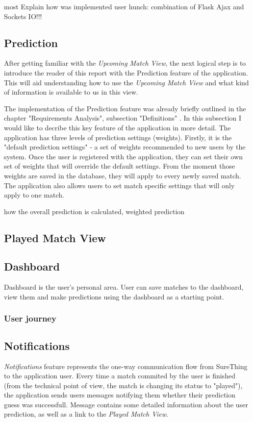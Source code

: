 most Explain how was implemented user hunch: combination of Flask Ajax and Sockets IO!!!
 
\subsection{Prediction}
\label{subsec:predictionimplementation}
After getting familiar with the \emph{Upcoming Match View}, the next logical step is to introduce the reader of this report with the Prediction feature of the application. This will aid understanding how to use the \emph{Upcoming Match View} and what kind of information is available to us in this view.

The implementation of the Prediction feature was already briefly outlined in the chapter "Requirements Analysis", subsection "Definitions" \cite{subsec:definitions}. In this subsection I would like to decribe this key feature of the application in more detail. The application has three levels of prediction settings (weights). Firstly, it is the "default prediction settings" - a set of weights recommended to new users by the system. Once the user is registered with the application, they can set their own set of weights that will override the default settings. From the moment those weights are saved in the database, they will apply to every newly saved match. The application also allows users to set match specific settings that will only apply to one match. 
 


how the overall prediction is calculated, weighted prediction

\subsection{Played Match View}
\label{subsec:playedmatchview}

\subsection{Dashboard}
\label{subsec:dashboard}
Dashboard is the user's personal area. User can save matches to the dashboard, view them and make predictions using the dashboard as a starting point. 

\subsubsection*{User journey}
\label{subsec:dashboarduserjourney}


\subsection{Notifications}
\label{subsec:notifications}
\emph{Notifications} feature represents the one-way communication flow from SureThing to the application user. Every time a match commited by the user is finished (from the technical point of view, the match is changing its status to "played"), the application sends users messages notifying them whether their prediction guess was successfull. Message contains some detailed information about the user prediction, as well as a link to the \emph{Played Match View}.

